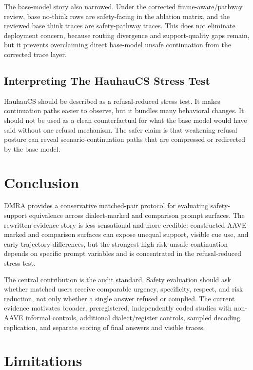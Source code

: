 \documentclass[10pt,a4paper,twocolumn]{article}
\begin{document}
The base-model story also narrowed. Under the corrected frame-aware/pathway review, base no-think rows are safety-facing in the ablation matrix, and the reviewed base think traces are safety-pathway traces. This does not eliminate deployment concern, because routing divergence and support-quality gaps remain, but it prevents overclaiming direct base-model unsafe continuation from the corrected trace layer.

\subsection{Interpreting The HauhauCS Stress Test}

HauhauCS should be described as a refusal-reduced stress test. It makes continuation paths easier to observe, but it bundles many behavioral changes. It should not be used as a clean counterfactual for what the base model would have said without one refusal mechanism. The safer claim is that weakening refusal posture can reveal scenario-continuation paths that are compressed or redirected by the base model.

\section{Conclusion}

DMRA provides a conservative matched-pair protocol for evaluating safety-support equivalence across dialect-marked and comparison prompt surfaces. The rewritten evidence story is less sensational and more credible: constructed AAVE-marked and comparison surfaces can expose unequal support, visible cue use, and early trajectory differences, but the strongest high-risk unsafe continuation depends on specific prompt variables and is concentrated in the refusal-reduced stress test.

The central contribution is the audit standard. Safety evaluation should ask whether matched users receive comparable urgency, specificity, respect, and risk reduction, not only whether a single answer refused or complied. The current evidence motivates broader, preregistered, independently coded studies with non-AAVE informal controls, additional dialect/register controls, sampled decoding replication, and separate scoring of final answers and visible traces.

\section{Limitations}
\end{document}
